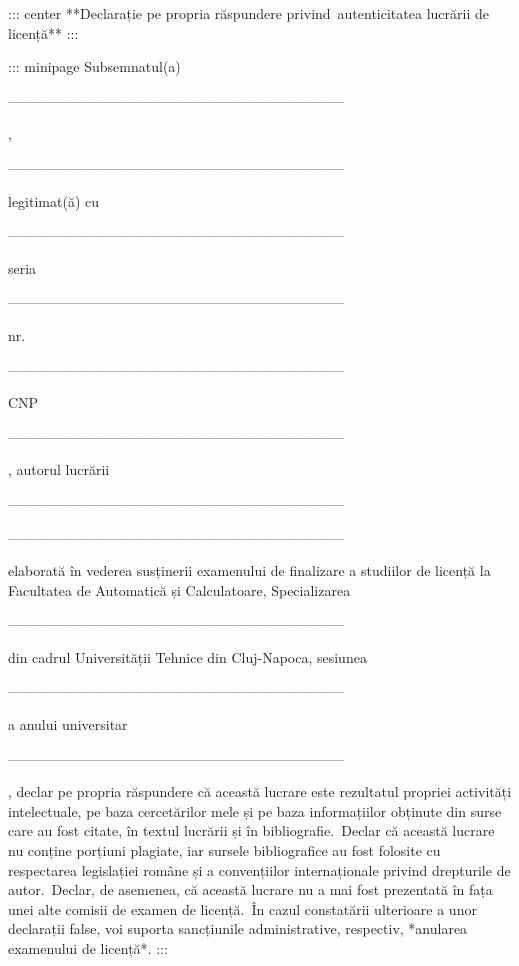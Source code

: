 ::: center
**Declarație pe propria răspundere privind\
autenticitatea lucrării de licență**
:::

::: minipage
Subsemnatul(a)

------------------------------------------------------------------------

,

------------------------------------------------------------------------

legitimat(ă) cu\

------------------------------------------------------------------------

seria

------------------------------------------------------------------------

nr.

------------------------------------------------------------------------

CNP

------------------------------------------------------------------------

, autorul lucrării 

------------------------------------------------------------------------

------------------------------------------------------------------------

elaborată în vederea susținerii examenului de finalizare a studiilor de
licență la Facultatea de Automatică și Calculatoare, Specializarea

------------------------------------------------------------------------

din cadrul Universității Tehnice din Cluj-Napoca, sesiunea

------------------------------------------------------------------------

a anului universitar

------------------------------------------------------------------------

, declar pe propria răspundere că această lucrare este rezultatul
propriei activități intelectuale, pe baza cercetărilor mele și pe baza
informațiilor obținute din surse care au fost citate, în textul lucrării
și în bibliografie.\
Declar că această lucrare nu conține porțiuni plagiate, iar sursele
bibliografice au fost folosite cu respectarea legislației române și a
convențiilor internaționale privind drepturile de autor.\
Declar, de asemenea, că această lucrare nu a mai fost prezentată în fața
unei alte comisii de examen de licență.\
În cazul constatării ulterioare a unor declarații false, voi suporta
sancțiunile administrative, respectiv, *anularea examenului de licență*.
:::

